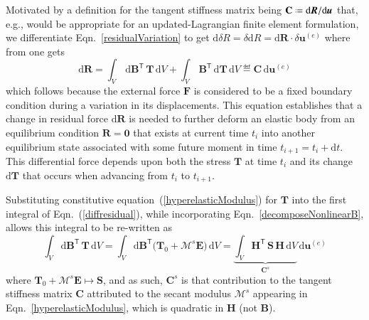 Motivated by a definition for the tangent stiffness matrix being $\mathbf{C} \defeq \mathrm{d}\boldsymbol{R} / \mathrm{d}\boldsymbol{u}$ that, e.g., would be appropriate for an updated-Lagrangian finite element formulation, we differentiate Eqn.~\eqref{residualVariation} to get $\mathrm{d} \delta R = \delta \mathrm{d} R = \mathrm{d} \boldsymbol{R} \cdot \delta \boldsymbol{u}^{(e)}$ where from one gets
\begin{equation}
    \mathrm{d} \boldsymbol{R} = \int_{V} \, \mathrm{d} \mathbf{B}^{\mathsf{T}} \, \boldsymbol{T} \, \mathrm{d} V + \int_{V} \, \mathbf{B}^{\mathsf{T}} \, \mathrm{d} \boldsymbol{T} \, \mathrm{d} V \eqdef \mathbf{C} \, \mathrm{d} \boldsymbol{u}^{(e)} 
    \label{diffresidual}
\end{equation}
which follows because the external force $\boldsymbol{F}$ is considered to be a fixed boundary condition during a variation in its displacements.  This equation establishes that a change in residual force $\mathrm{d}\boldsymbol{R}$ is needed to further deform an elastic body from an equilibrium condition $\boldsymbol{R} = \mathbf{0}$ that exists at current time $t_i$ into another equilibrium state associated with some future moment in time $t_{i+1} = t_i + \mathrm{d}t$.  This differential force depends upon both the stress $\boldsymbol{T}$ at time $t_i$ and its change $\mathrm{d} \boldsymbol{T}$ that occurs when advancing from $t_i$ to $t_{i+1}$.

Substituting constitutive equation~(\ref{hyperelasticModulus}) for $\boldsymbol{T}$ into the first integral of Eqn.~(\ref{diffresidual}), while incorporating Eqn.~\eqref{decomposeNonlinearB}, allows this integral to be re-written as
\begin{equation}
\int_V \mathrm{d} \mathbf{B}^{\mathsf{T}} \, \boldsymbol{T} \, \mathrm{d}V =
\int_V \mathrm{d} \mathbf{B}^{\mathsf{T}} \bigl( \boldsymbol{T}_0 + 
\boldsymbol{\mathcal{M}}^s \boldsymbol{E} \bigr) \, \mathrm{d}V =  
\underbrace{\int_V \mathbf{H}^{\mathsf{T}} \, \mathbf{S} \, \mathbf{H} \, \mathrm{d}V}_{\mathbf{C}^s}  \, \mathrm{d} \boldsymbol{u}^{(e)}
\label{secantStiffness}
\end{equation}
where $\boldsymbol{T}_0 + \boldsymbol{\mathcal{M}}^s \boldsymbol{E} \mapsto \mathbf{S}$, and as such, $\mathbf{C}^s$ is that contribution to the tangent stiffness matrix $\mathbf{C}$ attributed to the secant modulus $\boldsymbol{\mathcal{M}}^s$ appearing in Eqn.~\eqref{hyperelasticModulus}, which is quadratic in $\mathbf{H}$ (not $\mathbf{B}$).

